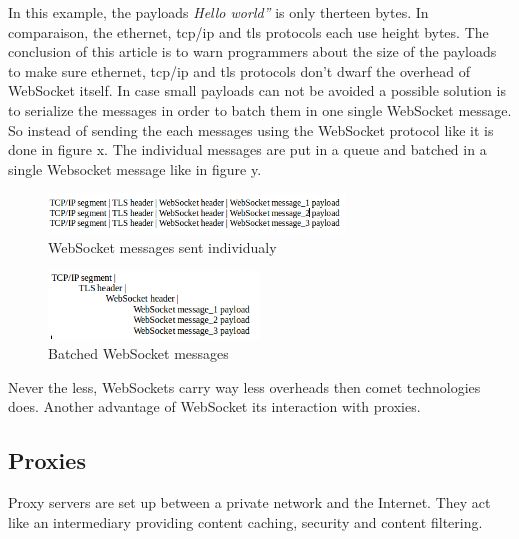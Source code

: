 In this example, the payloads \textit{Hello world”} is only therteen bytes. In comparaison, the ethernet, tcp/ip and tls protocols each use height bytes. The conclusion of this article is to warn programmers about the size of the payloads to make sure ethernet, tcp/ip and tls protocols don't dwarf the overhead of WebSocket itself. 
In case small payloads can not be avoided a possible solution is to serialize the messages in order to  batch them in one single WebSocket message.\\

So instead of sending the each messages using the WebSocket protocol like it is done in figure x. The individual messages are put in a queue and batched in a single Websocket message like in figure y.


\begin{figure}[htbp]
	\centering
		\includegraphics[width=0.7\textwidth]{./Figures/separate_websocket.png}
	\caption[separate_websocket]{WebSocket messages sent individualy \citep{Reference30}}
	\label{fig:separate_websocket}
\end{figure}

\begin{figure}[htbp]
	\centering
		\includegraphics[width=0.5\textwidth]{./Figures/batched_websocket.png}
	\caption[batched_websocket]{Batched WebSocket messages \citep{Reference30}}
	\label{fig:batched_websocket}
\end{figure}

Never the less, WebSockets carry way less overheads then comet technologies does. Another advantage of WebSocket its interaction with proxies.\\

\subsection{Proxies}

Proxy servers are set up between a private network and the Internet. They act like an intermediary providing content caching, security and content filtering.\\

